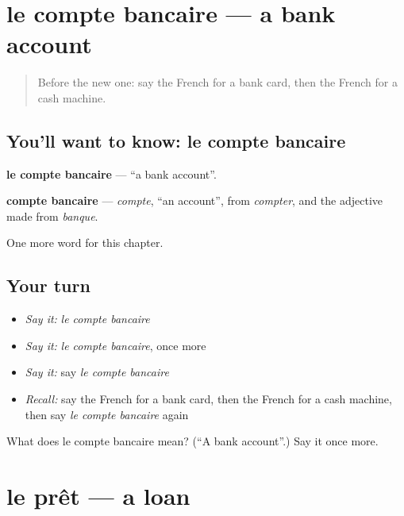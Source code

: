 \section[le compte bancaire]{le compte bancaire — a bank account}

\label{lesson:FR-C226-compte-bancaire}



\begin{quote}
Before the new one: say the French for a bank card, then the French for a cash machine.
\end{quote}

\subsection*{You'll want to know: le compte bancaire}
\textbf{le compte bancaire} — \textquotedblleft{}a bank account\textquotedblright{}.

\begin{cousinweb}
\textbf{compte bancaire} — \emph{compte}, \textquotedblleft{}an account\textquotedblright{}, from \emph{compter}, and the adjective made from \emph{banque}.
\end{cousinweb}

\begin{grammarlens}[title={What you've built}]
One more word for this chapter.
\end{grammarlens}

\subsection*{Your turn}
\begin{itemize}
\raggedright
  \item \emph{Say it:} \emph{le compte bancaire}
  \item \emph{Say it:} \emph{le compte bancaire}, once more
  \item \emph{Say it:} say \emph{le compte bancaire}
  \item \emph{Recall:} say the French for a bank card, then the French for a cash machine, then say \emph{le compte bancaire} again
\end{itemize}

\begin{tcolorbox}[breakable,colback=teal!4,colframe=teal!35!black,title={Before you move on}]
What does le compte bancaire mean? (\textquotedblleft{}A bank account\textquotedblright{}.) Say it once more.
\end{tcolorbox}
\section[le prêt]{le prêt — a loan}

